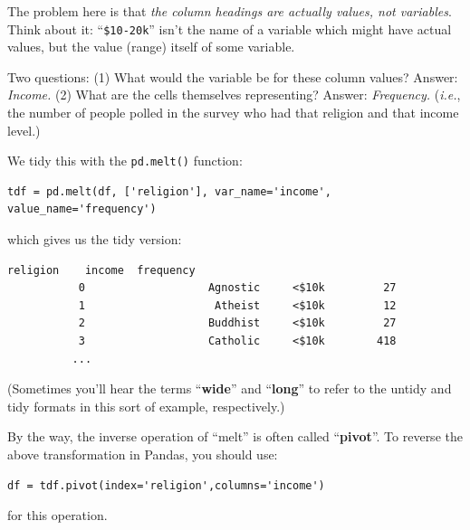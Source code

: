 The problem here is that \textit{the column headings are actually values, not
variables}. Think about it: ``\texttt{\$10-20k}'' isn't the name of a variable
which might have actual values, but the value (range) itself of some variable.

Two questions: (1) What would the variable be for these column values? Answer:
\textit{Income.} (2) What are the cells themselves representing? Answer:
\textit{Frequency.} (\textit{i.e.}, the number of people polled in the survey
who had that religion and that income level.)

We tidy this with the \texttt{pd.melt()} function:

\begin{Verbatim}[fontsize=\small,samepage=true,frame=single]
tdf = pd.melt(df, ['religion'], var_name='income', value_name='frequency')
\end{Verbatim}

which gives us the tidy version:
\begin{Verbatim}[fontsize=\small,samepage=true,frame=none]
                               religion    income  frequency
           0                   Agnostic     <$10k         27
           1                    Atheist     <$10k         12
           2                   Buddhist     <$10k         27
           3                   Catholic     <$10k        418
          ...
\end{Verbatim}

(Sometimes you'll hear the terms ``\textbf{wide}'' and ``\textbf{long}'' to
refer to the untidy and tidy formats in this sort of example, respectively.)

By the way, the inverse operation of ``melt'' is often called
``\textbf{pivot}''. To reverse the above transformation in Pandas, you should
use:

\begin{Verbatim}[fontsize=\small,samepage=true,frame=single]
df = tdf.pivot(index='religion',columns='income')
\end{Verbatim}

for this operation.


